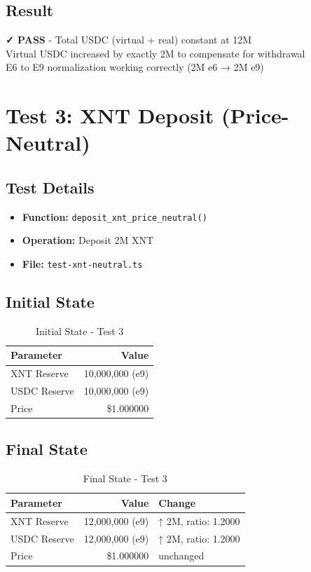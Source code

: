 \documentclass[11pt,a4paper]{article}
\begin{document}
\subsection{Result}
\begin{tcolorbox}[colback=success!10,colframe=success]
\textbf{✓ PASS} - Total USDC (virtual + real) constant at 12M\\
Virtual USDC increased by exactly 2M to compensate for withdrawal\\
E6 to E9 normalization working correctly (2M e6 → 2M e9)
\end{tcolorbox}

\newpage

\section{Test 3: XNT Deposit (Price-Neutral)}

\subsection{Test Details}
\begin{itemize}
    \item \textbf{Function:} \texttt{deposit\_xnt\_price\_neutral()}
    \item \textbf{Operation:} Deposit 2M XNT
    \item \textbf{File:} \texttt{test-xnt-neutral.ts}
\end{itemize}

\subsection{Initial State}
\begin{table}[h]
\centering
\begin{tabular}{lr}
\toprule
\textbf{Parameter} & \textbf{Value} \\
\midrule
XNT Reserve & 10,000,000 (e9) \\
USDC Reserve & 10,000,000 (e9) \\
Price & \$1.000000 \\
\bottomrule
\end{tabular}
\caption{Initial State - Test 3}
\end{table}

\subsection{Final State}
\begin{table}[h]
\centering
\begin{tabular}{lrl}
\toprule
\textbf{Parameter} & \textbf{Value} & \textbf{Change} \\
\midrule
XNT Reserve & 12,000,000 (e9) & ↑ 2M, ratio: 1.2000 \\
USDC Reserve & 12,000,000 (e9) & ↑ 2M, ratio: 1.2000 \\
Price & \$1.000000 & unchanged \\
\bottomrule
\end{tabular}
\caption{Final State - Test 3}
\end{table}
\end{document}
